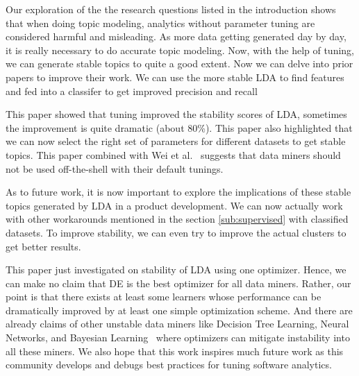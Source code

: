 \documentclass[10pt,conference]{IEEEtran}
\theoremstyle{break}
\begin{document}
Our exploration of the the research questions listed in the introduction shows that when doing topic modeling, analytics without parameter tuning are considered harmful and misleading. As more data getting generated day by day, it is really necessary to do accurate topic modeling. Now, with the help of tuning, we can generate stable topics to quite a good extent. Now we can delve into prior papers to improve their work. We can use the more stable LDA to find features and fed into a classifer to get improved precision and recall~\cite{chen2016topic,restificar2012inferring}

This paper showed that tuning improved the stability scores of LDA, sometimes the improvement is quite dramatic (about 80\%). This paper also highlighted that we can now select the right set of parameters for different datasets to get stable topics. This paper combined with Wei et al.~\cite{fu2016tuning} suggests that data miners should not be used off-the-shell with their default tunings.

As to future work, it is now important to explore the implications of these stable topics generated by LDA in a product development. We can now actually work with other workarounds mentioned in the section \ref{sub:supervised} with classified datasets. To improve stability, we can even try to improve the actual clusters to get better results.

This paper just investigated on stability of LDA using one optimizer. Hence, we can make no claim that DE is the best optimizer for all data miners. Rather, our point is that there exists at least some learners whose performance can be dramatically improved by at least one simple optimization scheme. And there are already claims of other unstable data miners like Decision Tree Learning, Neural Networks, and Bayesian Learning~\cite{zhang2005machine} where optimizers can mitigate instability into all these miners. We also hope that this work inspires much future work as this community develops and debugs best practices for tuning software analytics.



\medskip



\end{document}
